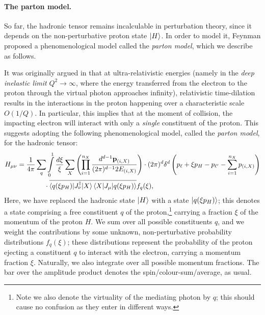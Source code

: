 \documentclass[withindex,glossary]{cam-thesis}
\renewcommand{\vec}[1]{\textbf{#1}} %
\begin{document}
\paragraph{The parton model.} So far, the hadronic tensor remains incalculable in perturbation theory, since it depends on the non-perturbative proton state $\ket{H}$. In order to model it, Feynman proposed a phenomenological model called the \textit{parton model}, which we describe as follows. 

It was originally argued in \cite{Feynman:1969wa} that at ultra-relativistic energies (namely in the \textit{deep inelastic limit} $Q^2 \rightarrow \infty$, where the energy transferred from the electron to the proton through the virtual photon approaches infinity), relativistic time-dilation results in the interactions in the proton happening over a characteristic scale $O(1/Q)$. In particular, this implies that at the moment of collision, the impacting electron will interact with only a \textit{single} constituent of the proton. This suggests adopting the following phenomenological model, called the \textit{parton model}, for the hadronic tensor:
\begin{align}
\label{eq:parton_model_hadronic_tensor}
H_{\mu\nu} &= \frac{1}{4\pi} \sum_{q} \int\limits_{0}^{1} \frac{d\xi}{\xi} \sum_{X} \left(\prod_{i=1}^{n_X} \frac{d^{d-1} \vec{p}_{(i,X)}}{(2\pi)^{d-1} 2E_{(i,X)}}\right) \cdot (2\pi)^d \delta^d\left(p_\ell + \xi p_H - p_{\ell'} - \sum_{i=1}^{n_X} p_{(i,X)}\right)\notag \\
&\qquad\qquad \cdot \overline{\braket{q(\xi p_H) | J_{\nu}^{\dagger} | X}\braket{X | J_{\mu} | q(\xi p_H) }} f_q(\xi),
\end{align}
Here, we have replaced the hadronic state $\ket{H}$ with a state $\ket{q(\xi p_H)}$; this denotes a state comprising a free constituent $q$ of the proton,\footnote{Note we also denote the virtuality of the mediating photon by $q$; this should cause no confusion as they enter in different ways.} carrying a fraction $\xi$ of the momentum of the proton $H$. We sum over all possible constituents $q$, and we weight the contributions by some unknown, non-perturbative probability distributions $f_q(\xi)$; these distributions represent the probability of the proton ejecting a constituent $q$ to interact with the electron, carrying a momentum fraction $\xi$. Naturally, we also integrate over all possible momentum fractions. The bar over the amplitude product denotes the spin/colour-sum/average, as usual.
\end{document}
